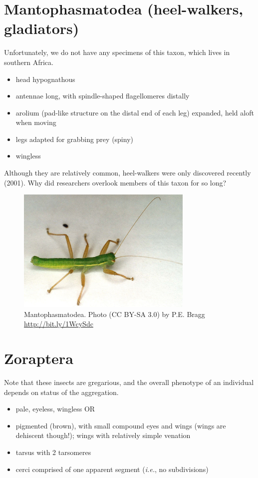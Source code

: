 \documentclass[letterpaper, 11pt]{article}
\begin{document}
\section{Mantophasmatodea (heel-walkers, gladiators)}

\noindent{}Unfortunately, we do not have any specimens of this taxon, which lives in southern Africa.
\begin{itemize}
\item head hypognathous
\item antennae long, with spindle-shaped flagellomeres distally
\item arolium (pad-like structure on the distal end of each leg) expanded, held aloft when moving
\item legs adapted for grabbing prey (spiny)
\item wingless
\end{itemize}

\noindent{}Although they are relatively common, heel-walkers were only discovered recently (2001). Why did researchers overlook members of this taxon for so long? 

\begin{figure}[ht!]
  \centering
    \includegraphics[width=0.75\textwidth]{mantophas}
  \caption{Mantophasmatodea. Photo (CC BY-SA 3.0) by P.E. Bragg \url{http://bit.ly/1WcySdc}}
  \label{fig:mantophas}
\end{figure}

\section{Zoraptera}

\noindent{}Note that these insects are gregarious, and the overall phenotype of an individual depends on status of the aggregation.
\begin{itemize}
\item pale, eyeless, wingless OR
\item pigmented (brown), with small compound eyes and wings (wings are dehiscent though!); wings with relatively simple venation
\item tarsus with 2 tarsomeres
\item cerci comprised of one apparent segment (\textit{i.e.}, no subdivisions)
\end{itemize}
\end{document}
